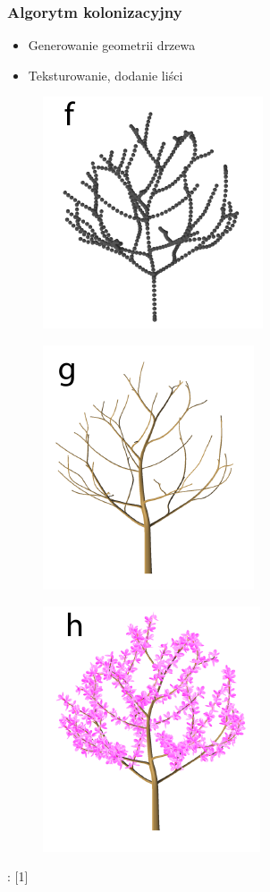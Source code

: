 \documentclass[blue,table]{beamer}
\begin{document}
\begin{frame}\frametitle{Algorytm kolonizacyjny}
\begin{itemize}
\item{Generowanie geometrii drzewa}
\item{Teksturowanie, dodanie liści}
\end{itemize}\begin{multicols}{3}
\begin{figure}
\includegraphics[scale=0.5]{img/colonization_6.png} 
\end{figure}
\begin{figure}
\includegraphics[scale=0.5]{img/colonization_7.png} 
\end{figure}
\begin{figure}
\includegraphics[scale=0.5]{img/colonization_8.png} 
\end{figure}
\end{multicols}
\begin{footnotesize}
: [1]
\end{footnotesize}
\end{frame}
\end{document}
